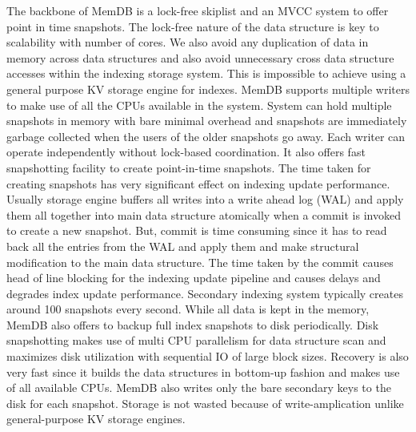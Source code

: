 \documentclass{vldb}
\begin{document}
    The backbone of MemDB is a lock-free skiplist and an MVCC system to offer point in time snapshots. The lock-free nature of the data structure is key to scalability with number of cores. We also avoid any duplication of data in memory across data structures and also avoid unnecessary cross data structure accesses within the indexing storage system. This is impossible to achieve using a general purpose KV storage engine for indexes. MemDB supports multiple writers to make use of all the CPUs available in the system. System can hold multiple snapshots in memory with bare minimal overhead and snapshots are immediately garbage collected when the users of the older snapshots go away. Each writer can operate independently without lock-based coordination. It also offers fast snapshotting facility to create point-in-time snapshots. The time taken for creating snapshots has very significant effect on indexing update performance. Usually storage engine buffers all writes into a write ahead log (WAL) and apply them all together into main data structure atomically when a commit is invoked to create a new snapshot. But, commit is time consuming since it has to read back all the entries from the WAL and apply them and make structural modification to the main data structure. The time taken by the commit causes head of line blocking for the indexing update pipeline and causes delays and degrades index update performance. Secondary indexing system typically creates around 100 snapshots every second. While all data is kept in the memory, MemDB also offers to backup full index snapshots to disk periodically. Disk snapshotting makes use of multi CPU parallelism for data structure scan and maximizes disk utilization with sequential IO of large block sizes. Recovery is also very fast since it builds the data structures in bottom-up fashion and makes use of all available CPUs. MemDB also writes only the bare secondary keys to the disk for each snapshot. Storage is not wasted because of write-amplication unlike general-purpose KV storage engines.
\end{document}
